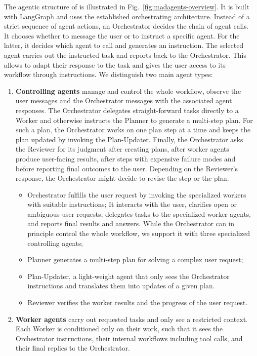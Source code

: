 \documentclass[submission, Phys]{SciPost}
\begin{document}
The agentic structure of \ma is illustrated in Fig.~\ref{fig:madagents-overview}. It is built with \href{https://www.langchain.com/langgraph}{LangGraph} and uses the established orchestrating architecture. Instead of a strict sequence of agent actions, an Orchestrator decides the chain of agent calls. It chooses whether to message the user or to instruct a specific agent. For the latter, it decides which agent to call and generates an instruction. The selected agent carries out the instructed task and reports back to the Orchestrator. This allows \ma to adapt their response to the task and gives the user access to its workflow through instructions. We distinguish two main agent types:
%
\begin{enumerate}
\item \textbf{Controlling agents} manage and control the whole workflow, observe the user messages and the Orchestrator messages with the associated agent responses. The Orchestrator delegates straight-forward tasks directly to a Worker and otherwise instructs the Planner to generate a multi-step plan. For such a plan, the Orchestrator works on one plan step at a time and keeps the plan updated by invoking the Plan-Updater. Finally, the Orchestrator asks the Reviewer for its judgment after creating plans,  after worker agents produce user-facing results, after steps with expensive failure modes and before reporting final outcomes to the user. Depending on the Reviewer's response, the Orchestrator might decide to revise the step or the plan.
  \begin{itemize}
  \item Orchestrator fulfills the user request by invoking the specialized workers with suitable instructions; It interacts with the user, clarifies open or ambiguous user requests, delegates tasks to the specialized worker agents, and reports final results and answers. While the Orchestrator can in principle control the whole workflow, we support it with three specialized controlling agents;
  \item Planner generates a multi-step plan for solving a complex user request;
  \item Plan-Updater, a light-weight agent that only sees the Orchestrator instructions and translates them into updates of a given plan. 
  \item Reviewer verifies the worker results and the progress of the user request.
  \end{itemize}
\item \textbf{Worker agents} carry out requested tasks and only see a restricted context. Each Worker is conditioned only on their work, such that it sees the Orchestrator instructions, their internal workflows including tool calls, and their final replies to the Orchestrator.

\end{enumerate}
\end{document}

